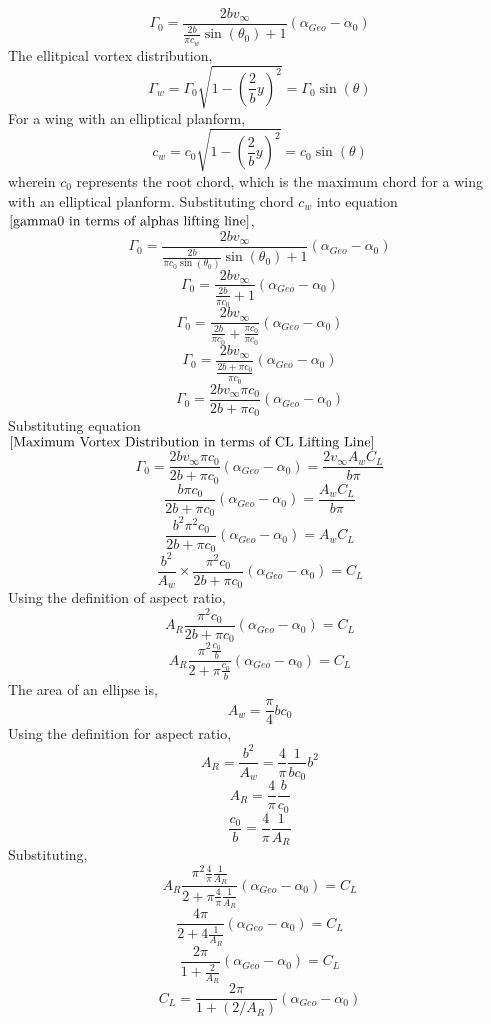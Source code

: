 \documentclass[a4paper, 12pt]{report}
\begin{document}
\begin{center}
$$\Gamma_{0} = \frac{2bv_{\infty}}{\displaystyle \frac{2b}{\pi c_{w}}\sin(\theta_{0}) + 1}\left(\alpha_{Geo} - \alpha_{0}\right)$$
The ellitpical vortex distribution,
$$\Gamma_{w} = \Gamma_{0}\sqrt{1-\left(\frac{2}{b}y\right)^{2}} = \Gamma_{0}\sin(\theta)$$
For a wing with an elliptical planform,
$$c_{w} = c_{0}\sqrt{1-\left(\frac{2}{b}y\right)^{2}} = c_{0}\sin(\theta)$$
wherein $c_{0}$ represents the root chord, which is the maximum chord for a wing with an elliptical planform. Substituting chord $c_{w}$ into equation $\ref{gamma0 in terms of alphas lifting line}$,
$$\Gamma_{0} = \frac{2bv_{\infty}}{\displaystyle \frac{2b}{\pi c_{0}\sin(\theta_{0})}\sin(\theta_{0}) + 1}\left(\alpha_{Geo} - \alpha_{0}\right)$$
$$\Gamma_{0} = \frac{2bv_{\infty}}{\displaystyle \frac{2b}{\pi c_{0}} + 1}\left(\alpha_{Geo} - \alpha_{0}\right)$$
$$\Gamma_{0} = \frac{2bv_{\infty}}{\displaystyle \frac{2b}{\pi c_{0}} + \frac{\pi c_{0}}{\pi c_{0}}}\left(\alpha_{Geo} - \alpha_{0}\right)$$
$$\Gamma_{0} = \frac{2bv_{\infty}}{\displaystyle \frac{2b + \pi c_{0}}{\pi c_{0}}}\left(\alpha_{Geo} - \alpha_{0}\right)$$
$$\Gamma_{0} = \frac{2bv_{\infty}\pi c_{0}}{2b + \pi c_{0}}\left(\alpha_{Geo} - \alpha_{0}\right)$$
Substituting equation $\ref{Maximum Vortex Distribution in terms of CL Lifting Line}$
$$\Gamma_{0} = \frac{2bv_{\infty}\pi c_{0}}{2b + \pi c_{0}}\left(\alpha_{Geo} - \alpha_{0}\right) = \frac{2 v_{\infty}A_{w} C_{L}}{b\pi}$$
$$\frac{b\pi c_{0}}{2b + \pi c_{0}}\left(\alpha_{Geo} - \alpha_{0}\right) = \frac{A_{w} C_{L}}{b\pi}$$
$$\frac{b^{2}\pi^{2} c_{0}}{2b + \pi c_{0}}\left(\alpha_{Geo} - \alpha_{0}\right) = A_{w} C_{L}$$
$$\frac{b^{2}}{A_{w}}\times\frac{\pi^{2} c_{0}}{2b + \pi c_{0}}\left(\alpha_{Geo} - \alpha_{0}\right) =  C_{L}$$
Using the definition of aspect ratio,
$$A_{R} \frac{\pi^{2} c_{0}}{2b + \pi c_{0}}\left(\alpha_{Geo} - \alpha_{0}\right) =  C_{L}$$
$$A_{R} \frac{\displaystyle \pi^{2} \frac{c_{0}}{b}}{\displaystyle 2 + \pi \frac{c_{0}}{b}}\left(\alpha_{Geo} - \alpha_{0}\right) =  C_{L}$$
The area of an ellipse is,
$$A_{w} = \frac{\pi}{4}bc_{0}$$
Using the definition for aspect ratio,
$$A_{R} = \frac{b^{2}}{A_{w}} = \frac{4}{\pi}\frac{1}{bc_{0}}b^{2}$$
$$A_{R} = \frac{4}{\pi}\frac{b}{c_{0}}$$
$$\frac{c_{0}}{b} = \frac{4}{\pi}\frac{1}{A_{R}}$$
Substituting,
$$A_{R} \frac{\displaystyle \pi^{2} \frac{4}{\pi}\frac{1}{A_{R}}}{\displaystyle 2 + \pi \frac{4}{\pi}\frac{1}{A_{R}}}\left(\alpha_{Geo} - \alpha_{0}\right) =  C_{L}$$
$$\frac{4\pi}{\displaystyle 2 + 4\frac{1}{A_{R}}}\left(\alpha_{Geo} - \alpha_{0}\right) =  C_{L}$$
$$ \frac{2\pi}{\displaystyle 1 + \frac{2}{A_{R}}}\left(\alpha_{Geo} - \alpha_{0}\right) =  C_{L}$$
\begin{equation}
C_{L} = \frac{2\pi}{\displaystyle 1 + (2/A_{R})}\left(\alpha_{Geo} - \alpha_{0}\right)
\label{Lift Coefficient in terms of alphas and aspect ratio lifting line}
\end{equation}


\end{center}
\end{document}
